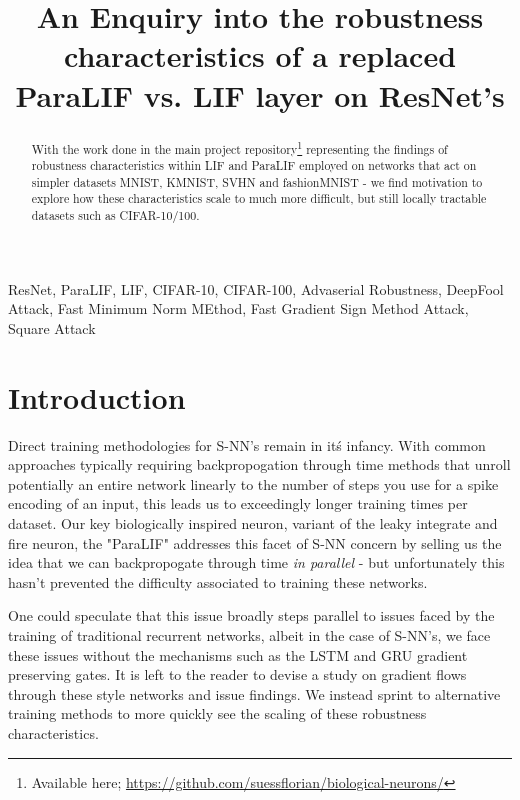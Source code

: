 \documentclass[conference]{IEEEtran}
\begin{document}
\title{An Enquiry into the robustness characteristics of a replaced ParaLIF vs. LIF layer on ResNet's}

\author{
}

\maketitle

\begin{abstract}
With the work done in the main project repository\footnote{Available here; \url{https://github.com/suessflorian/biological-neurons/}} representing the findings of robustness characteristics within LIF and ParaLIF employed on networks that act on simpler datasets MNIST, KMNIST, SVHN and fashionMNIST - we find motivation to explore how these characteristics scale to much more difficult, but still locally tractable datasets such as CIFAR-10/100.
\end{abstract}

\begin{IEEEkeywords}
ResNet, ParaLIF, LIF, CIFAR-10, CIFAR-100, Advaserial Robustness, DeepFool Attack, Fast Minimum Norm MEthod, Fast Gradient Sign Method Attack, Square Attack
\end{IEEEkeywords}

\section{Introduction}
Direct training methodologies for S-NN's remain in it\'s infancy. With common approaches typically requiring backpropogation through time methods that unroll potentially an entire network linearly to the number of steps you use for a spike encoding of an input, this leads us to exceedingly longer training times per dataset. Our key biologically inspired neuron, variant of the leaky integrate and fire neuron, the "ParaLIF" addresses this facet of S-NN concern by selling us the idea that we can backpropogate through time \emph{in parallel} - but unfortunately this hasn't prevented the difficulty associated to training these networks.

One could speculate that this issue broadly steps parallel to issues faced by the training of traditional recurrent networks, albeit in the case of S-NN's, we face these issues without the mechanisms such as the LSTM and GRU gradient preserving gates. It is left to the reader to devise a study on gradient flows through these style networks and issue findings. We instead sprint to alternative training methods to more quickly see the scaling of these robustness characteristics.
\end{document}
